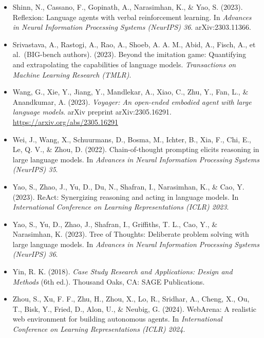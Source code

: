 \documentclass[11pt]{article}
\begin{document}
\begin{itemize}[leftmargin=*, label={}]
\item Shinn, N., Cassano, F., Gopinath, A., Narasimhan, K., \& Yao, S. (2023). Reflexion: Language agents with verbal reinforcement learning. In \emph{Advances in Neural Information Processing Systems (NeurIPS) 36}. arXiv:2303.11366.

\item Srivastava, A., Rastogi, A., Rao, A., Shoeb, A. A. M., Abid, A., Fisch, A., et al.\ (BIG-bench authors). (2023). Beyond the imitation game: Quantifying and extrapolating the capabilities of language models. \emph{Transactions on Machine Learning Research (TMLR)}.

\item Wang, G., Xie, Y., Jiang, Y., Mandlekar, A., Xiao, C., Zhu, Y., Fan, L., \& Anandkumar, A. (2023). \emph{Voyager: An open-ended embodied agent with large language models}. arXiv preprint arXiv:2305.16291. \url{https://arxiv.org/abs/2305.16291}

\item Wei, J., Wang, X., Schuurmans, D., Bosma, M., Ichter, B., Xia, F., Chi, E., Le, Q. V., \& Zhou, D. (2022). Chain-of-thought prompting elicits reasoning in large language models. In \emph{Advances in Neural Information Processing Systems (NeurIPS) 35}.

\item Yao, S., Zhao, J., Yu, D., Du, N., Shafran, I., Narasimhan, K., \& Cao, Y. (2023). ReAct: Synergizing reasoning and acting in language models. In \emph{International Conference on Learning Representations (ICLR) 2023}.

\item Yao, S., Yu, D., Zhao, J., Shafran, I., Griffiths, T. L., Cao, Y., \& Narasimhan, K. (2023). Tree of Thoughts: Deliberate problem solving with large language models. In \emph{Advances in Neural Information Processing Systems (NeurIPS) 36}.

\item Yin, R. K. (2018). \emph{Case Study Research and Applications: Design and Methods} (6th ed.). Thousand Oaks, CA: SAGE Publications.

\item Zhou, S., Xu, F. F., Zhu, H., Zhou, X., Lo, R., Sridhar, A., Cheng, X., Ou, T., Bisk, Y., Fried, D., Alon, U., \& Neubig, G. (2024). WebArena: A realistic web environment for building autonomous agents. In \emph{International Conference on Learning Representations (ICLR) 2024}.
\end{itemize}
\end{document}
